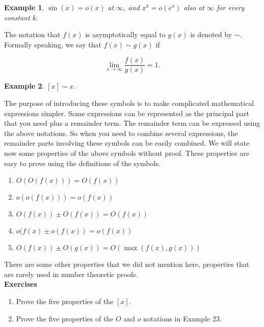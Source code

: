 \documentclass[12pt,letterpaper]{book}
\newtheorem{example}{Example}
\begin{document}
\begin{example}
$\sin(x)=o(x)$ at $\infty$, and $x^k=o(e^x)$ also at $\infty$ for every constant $k$.
\end{example}

The notation that $f(x)$ is asymptotically equal
to $g(x)$ is denoted by $\sim$.  Formally speaking, we say that
$f(x) \sim g(x)$ if

\begin{equation}
\lim_{x\rightarrow \infty}\frac{f(x)}{g(x)}=1.
\end{equation}

\begin{example}
$[x] \sim x$.
\end{example}

The purpose of introducing these symbols is to make complicated
mathematical expressions simpler.  Some expressions can be
represented as the principal part that you need plus a remainder
term.  The remainder term can be expressed using the above
notations.  So when you need to combine several expressions, the
remainder parts involving these symbols can be easily combined. We
will state now some properties of the above symbols without proof.
These properties are easy to prove using the definitions of the
symbols.
\begin{enumerate}
\item{$O(O(f(x)))=O(f(x))$}\item{$o(o(f(x)))=o(f(x))$}
\item{$O(f(x))\pm O(f(x))=O(f(x))$} \item{$o(f(x)\pm
o(f(x))=o(f(x))$} \item{$O(f(x))\pm O(g(x))=O(\max(f(x), g(x)))$}
\end{enumerate}
There are some other properties that we did not mention here,
properties that are rarely used in number theoretic proofs.\\
\textbf{Exercises}
\begin{enumerate}
\item{Prove the five properties of the $[x]$.}
\item{Prove the five properties of the $O$ and $o$ notations in Example 23.}
\end{enumerate}

\newpage
\end{document}
